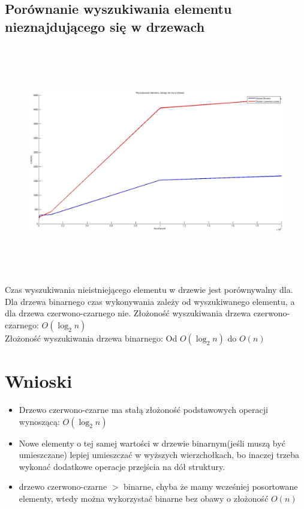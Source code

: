 \documentclass[a4paper,11pt]{article}
\begin{document}
\subsection{Porównanie wyszukiwania elementu nieznajdującego się w drzewach}
\begin{center}
\begin{figure}[h!]
\includegraphics[width=12.5cm,height=10cm]{Wykresy2/NieIstniejacy}
\end{figure}
\end{center}
Czas wyszukiwania nieistniejącego elementu w drzewie jest porównywalny dla. Dla drzewa binarnego czas wykonywania zależy od wyszukiwanego elementu, a dla drzewa czerwono-czarnego nie.
Złożoność wyszukiwania drzewa czerwono-czarnego:
$O(\log_2 n)
$
\\
Złożoność wyszukiwania drzewa binarnego:
Od
$O(\log_2 n)
$
do
$O(n) 
$ 

\newpage
\section{Wnioski}
\begin{itemize}
\item Drzewo czerwono-czarne ma stałą złożoność podstawowych operacji wynoszącą:
$O(\log_2 n)
$
\item Nowe elementy o tej samej wartości w drzewie binarnym(jeśli muszą być umieszczane) lepiej umieszczać w wyższych wierzchołkach, bo inaczej trzeba wykonać dodatkowe operacje przejścia na dół struktury.
\item drzewo czerwono-czarne $>$ binarne, chyba że mamy wcześniej posortowane elementy, wtedy można wykorzystać binarne bez obawy o złożoność $O(n) 
$ 
\end{itemize}
\end{document}
